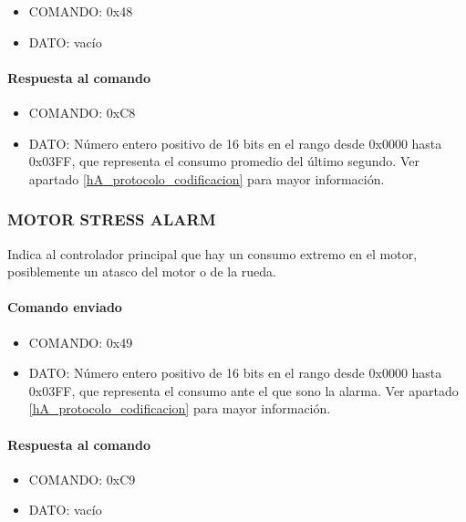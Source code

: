 \begin{itemize}
	\item{COMANDO:} 0x48
	\item{DATO:} vac\'io
\end{itemize}

\paragraph*{Respuesta al comando}

\begin{itemize}
	\item{COMANDO:} 0xC8
	\item{DATO:} N\'umero entero positivo de 16 bits en el rango desde 0x0000 hasta 0x03FF, que representa el consumo promedio del \'ultimo segundo.
		Ver apartado \ref{hA_protocolo_codificacion} para mayor informaci\'on.
\end{itemize}

\subsubsection{MOTOR STRESS ALARM}
\label{hA_protocolo_motor_stress_alarm}

Indica al controlador principal que hay un consumo extremo en el motor, posiblemente un atasco del motor o de la rueda.

\paragraph*{Comando enviado}

\begin{itemize}
	\item{COMANDO:} 0x49
	\item{DATO:} N\'umero entero positivo de 16 bits en el rango desde 0x0000 hasta 0x03FF, que representa el consumo ante el que sono la alarma.
		Ver apartado \ref{hA_protocolo_codificacion} para mayor informaci\'on.
\end{itemize}

\paragraph*{Respuesta al comando}

\begin{itemize}
	\item{COMANDO:} 0xC9
	\item{DATO:} vac\'io
\end{itemize}

